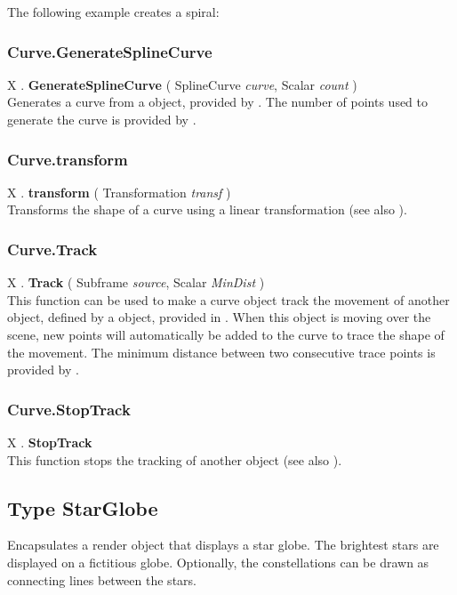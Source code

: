 The following example creates a spiral: \\

\subsubsection{Curve.GenerateSplineCurve \label{F:Curve:GenerateSplineCurve}}
X . \textbf{GenerateSplineCurve} ( SplineCurve \textit{curve}, Scalar \textit{count} ) \\
Generates a curve from a  object, provided by . The number of points used to generate the curve is provided by .

\subsubsection{Curve.transform \label{F:Curve:transform}}
X . \textbf{transform} ( Transformation \textit{transf} ) \\
Transforms the shape of a curve using a linear transformation (see also ).

\subsubsection{Curve.Track \label{F:Curve:Track}}
X . \textbf{Track} ( Subframe \textit{source}, Scalar \textit{MinDist} ) \\
This function can be used to make a curve object track the movement of another object, defined by a  object, provided in . When this object is moving over the scene, new points will automatically be added to the curve to trace the shape of the movement. The minimum distance between two consecutive trace points is provided by .

\subsubsection{Curve.StopTrack \label{F:Curve:StopTrack}}
X . \textbf{StopTrack} \\
This function stops the tracking of another object (see also ).

\subsection{Type StarGlobe \label{T:StarGlobe}}
Encapsulates a render object that displays a star globe. The brightest stars are displayed on a fictitious globe. Optionally, the constellations can be drawn as connecting lines between the stars.

